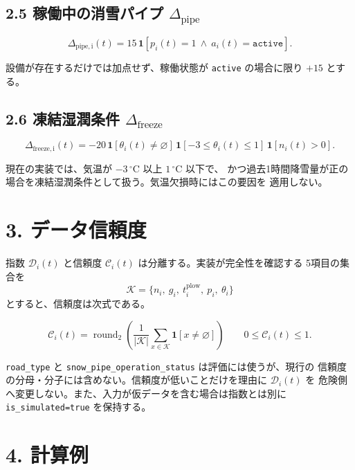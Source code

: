 \documentclass[11pt,a4paper]{article}
\newcommand{\ind}[1]{\mathbf{1}\!\left[#1\right]}
\newcommand{\missing}{\varnothing}
\newcommand{\score}{\mathcal{D}}
\newcommand{\factor}[1]{\Delta_{\mathrm{#1}}}
\newcommand{\code}[1]{\texttt{#1}}
\begin{document}
\subsection*{2.5 稼働中の消雪パイプ $\factor{pipe}$}

\begin{equation}
\factor{pipe,i}(t)
=15\,\ind{p_i(t)=1\ \land\ a_i(t)=\code{active}}.
\end{equation}

設備が存在するだけでは加点せず、稼働状態が \code{active} の場合に限り $+15$ とする。

\subsection*{2.6 凍結湿潤条件 $\factor{freeze}$}

\begin{equation}
\factor{freeze,i}(t)
=-20\,
\ind{\theta_i(t)\ne\missing}\,
\ind{-3\le\theta_i(t)\le1}\,
\ind{n_i(t)>0}.
\end{equation}

現在の実装では、気温が $-3\,{}^\circ\mathrm{C}$ 以上 $1\,{}^\circ\mathrm{C}$ 以下で、
かつ過去1時間降雪量が正の場合を凍結湿潤条件として扱う。気温欠損時にはこの要因を
適用しない。

\clearpage
\section*{3. データ信頼度}

指数 $\score_i(t)$ と信頼度 $\mathcal{C}_i(t)$ は分離する。実装が完全性を確認する
5項目の集合を
\begin{equation}
\mathcal{K}=\{n_i,\ g_i,\ t_i^{\mathrm{plow}},\ p_i,\ \theta_i\}
\end{equation}
とすると、信頼度は次式である。

\begin{equation}
\boxed{
\mathcal{C}_i(t)
=\operatorname{round}_{2}
\left(
\frac{1}{|\mathcal{K}|}
\sum_{x\in\mathcal{K}}\ind{x\ne\missing}
\right)
}
\qquad 0\le\mathcal{C}_i(t)\le1.
\end{equation}

\code{road\_type} と \code{snow\_pipe\_operation\_status} は評価には使うが、現行の
信頼度の分母・分子には含めない。信頼度が低いことだけを理由に $\score_i(t)$ を
危険側へ変更しない。また、入力が仮データを含む場合は指数とは別に
\code{is\_simulated=true} を保持する。

\section*{4. 計算例}
\end{document}
